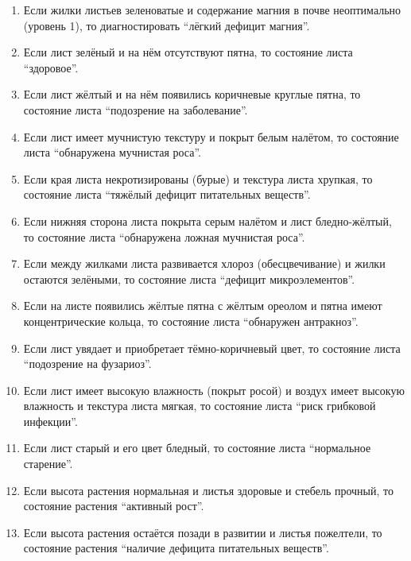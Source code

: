\begin{enumerate}
    \item Если жилки листьев зеленоватые и содержание магния в почве неоптимально (уровень 1), то диагностировать \enquote{лёгкий дефицит магния}.

    \item Если лист зелёный и на нём отсутствуют пятна, то состояние листа \enquote{здоровое}.

    \item Если лист жёлтый и на нём появились коричневые круглые пятна, то состояние листа \enquote{подозрение на заболевание}.

    \item Если лист имеет мучнистую текстуру и покрыт белым налётом, то состояние листа \enquote{обнаружена мучнистая роса}.

    \item Если края листа некротизированы (бурые) и текстура листа хрупкая, то состояние листа \enquote{тяжёлый дефицит питательных веществ}.

    \item Если нижняя сторона листа покрыта серым налётом и лист бледно-жёлтый, то состояние листа \enquote{обнаружена ложная мучнистая роса}.

    \item Если между жилками листа развивается хлороз (обесцвечивание) и жилки остаются зелёными, то состояние листа \enquote{дефицит микроэлементов}.

    \item Если на листе появились жёлтые пятна с жёлтым ореолом и пятна имеют концентрические кольца, то состояние листа \enquote{обнаружен антракноз}.

    \item Если лист увядает и приобретает тёмно-коричневый цвет, то состояние листа \enquote{подозрение на фузариоз}.

    \item Если лист имеет высокую влажность (покрыт росой) и воздух имеет высокую влажность и текстура листа мягкая, то состояние листа \enquote{риск грибковой инфекции}.

    \item Если лист старый и его цвет бледный, то состояние листа \enquote{нормальное старение}.

    \item Если высота растения нормальная и листья здоровые и стебель прочный, то состояние растения \enquote{активный рост}.

    \item Если высота растения остаётся позади в развитии и листья пожелтели, то состояние растения \enquote{наличие дефицита питательных веществ}.


\end{enumerate}
